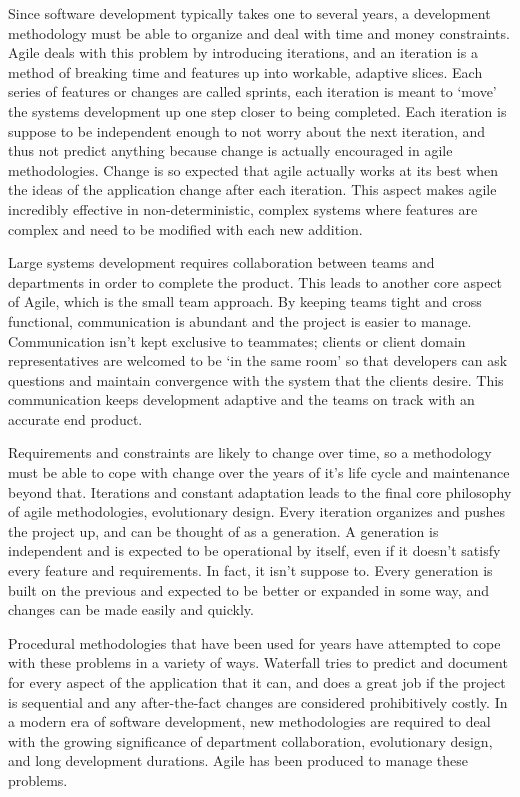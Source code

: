 \documentclass[11pt]{article}
\newcommand{\tab}{\hspace*{2em}}
\begin{document}
\begin{doublespace}
	\tab Since software development typically takes one to several years, a development methodology must be able to organize and deal with time and money constraints. Agile deals with this problem by introducing iterations, and an iteration is a method of breaking time and features up into workable, adaptive slices. Each series of features or changes are called sprints, each iteration is meant to ‘move’ the systems development up one step closer to being completed. Each iteration is suppose to be independent enough to not worry about the next iteration, and thus not predict anything because change is actually encouraged in agile methodologies. Change is so expected that agile actually works at its best when the ideas of the application change after each iteration. This aspect makes agile incredibly effective in non-deterministic, complex systems where features are complex and need to be modified with each new addition.
    
	\tab Large systems development requires collaboration between teams and departments in order to complete the product. This leads to another core aspect of Agile, which is the small team approach. By keeping teams tight and cross functional, communication is abundant and the project is easier to manage. Communication isn’t kept exclusive to teammates; clients or client domain representatives are welcomed to be ‘in the same room’ so that developers can ask questions and maintain convergence with the system that the clients desire. This communication keeps development adaptive and the teams on track with an accurate end product. 
    
	\tab  Requirements and constraints are likely to change over time, so a methodology must be able to cope with change over the years of it’s life cycle and maintenance beyond that. Iterations and constant adaptation leads to the final core philosophy of agile methodologies, evolutionary design. Every iteration organizes and pushes the project up, and can be thought of as a generation. A generation is independent and is expected to be operational by itself, even if it doesn’t satisfy every feature and requirements. In fact, it isn’t suppose to. Every generation is built on the previous and expected to be better or expanded in some way, and changes can be made easily and quickly. 
    
	\tab Procedural methodologies that have been used for years have attempted to cope with these problems in a variety of ways. Waterfall tries to predict and document for every aspect of the application that it can, and does a great job if the project is sequential and any after-the-fact changes are considered prohibitively costly. In a modern era of software development, new methodologies are required to deal with the growing significance of department collaboration, evolutionary design, and long development durations. Agile has been produced to manage these problems. 


\end{doublespace}
\end{document}
